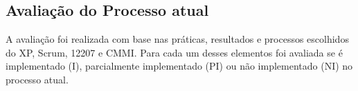 \begin{apendices}
 

 
 
 
\chapter{Avaliação do Processo atual} \label{ap:avaliacao}

A avaliação foi realizada com base nas práticas, resultados e processos escolhidos do XP, Scrum, 12207 e CMMI. 
Para cada um desses elementos foi avaliada se é implementado (I), parcialmente implementado (PI) ou não implementado (NI) no processo
atual. 

\begin{table}[H]
\centering
\caption{Avaliação do processo de acordo com os processos escolhidos do CMMI}
\end{table}
\end{apendices}
